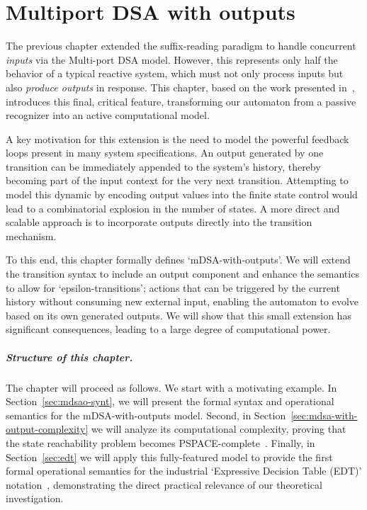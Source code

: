 \chapter{Multiport DSA with outputs}
\label{sec:multiport-outputs}

The previous chapter extended the suffix-reading paradigm to handle concurrent \emph{inputs} via the Multi-port DSA model. However, this represents only half the behavior of a typical reactive system, which must not only process inputs but also \emph{produce outputs} in response. This chapter, based on the work presented in~\cite{Keerthan2025netys}, introduces this final, critical feature, transforming our automaton from a passive recognizer into an active computational model.

A key motivation for this extension is the need to model the powerful feedback loops present in many system specifications. An output generated by one transition can be immediately appended to the system's history, thereby becoming part of the input context for the very next transition. %
Attempting to model this dynamic by encoding output values into the finite state control would lead to a combinatorial explosion in the number of states. A more direct and scalable approach is to incorporate outputs directly into the transition mechanism.

To this end, this chapter formally defines `mDSA-with-outputs'. We will extend the transition syntax to include an output component and enhance the semantics to allow for `epsilon-transitions'; actions that can be triggered by the current history without consuming new external input, enabling the automaton to evolve based on its own generated outputs. We will show that this small extension has significant consequences, leading to a large degree of computational power.

\paragraph*{Structure of this chapter.} The chapter will proceed as follows. We start with a motivating example. In Section~\ref{sec:mdsao-synt}, we will present the formal syntax and operational semantics for the mDSA-with-outputs model. Second, in Section~\ref{sec:mdsa-with-output-complexity} we will analyze its computational complexity, proving that the state reachability problem becomes PSPACE-complete~\cite{Keerthan2025netys}. Finally, in Section~\ref{sec:edt} we will apply this fully-featured model to provide the first formal operational semantics for the industrial `Expressive Decision Table (EDT)' notation~\cite{DBLP:conf/date/VenkateshSKA14}, demonstrating the direct practical relevance of our theoretical investigation.

